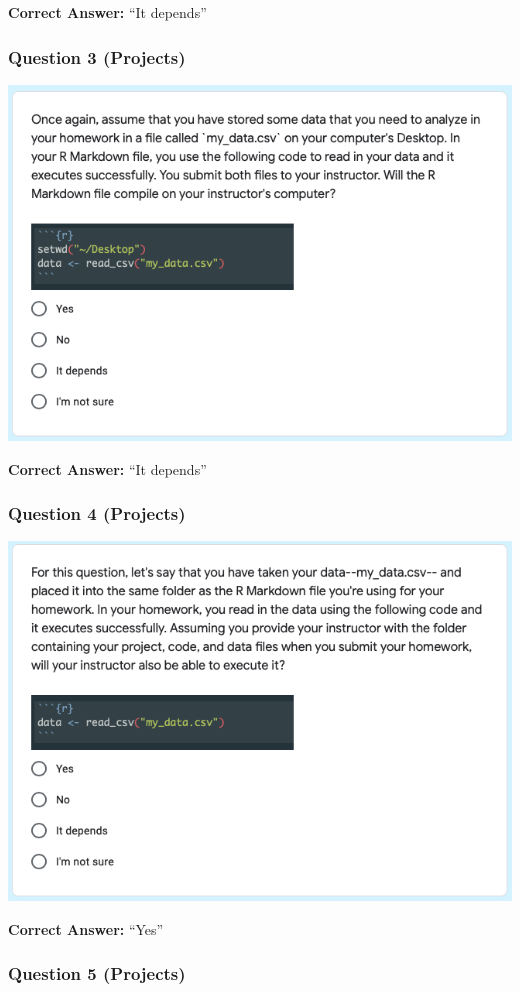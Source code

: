 \documentclass[12pt,twoside]{reedthesis}
\begin{document}
\textbf{Correct Answer:} ``It depends''

\hypertarget{question-3-projects}{%
\subsubsection{Question 3 (Projects)}\label{question-3-projects}}

\includegraphics[width=0.8\linewidth]{figure/appendix/test-3}

\textbf{Correct Answer:} ``It depends''

\hypertarget{question-4-projects}{%
\subsubsection{Question 4 (Projects)}\label{question-4-projects}}

\includegraphics[width=0.8\linewidth]{figure/appendix/test-4}

\textbf{Correct Answer:} ``Yes''

\hypertarget{question-5-projects}{%
\subsubsection{Question 5 (Projects)}\label{question-5-projects}}
\end{document}
